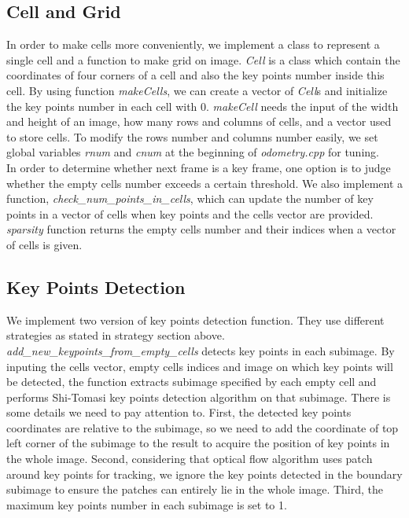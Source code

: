 \documentclass{easychair}
\begin{document}
\subsection{Cell and Grid}
In order to make cells more conveniently, we implement a class to represent a single cell and a function to make grid on image. \emph{Cell} is a class which contain the coordinates of four corners of a cell and also the key points number inside this cell. By using function \emph{makeCells}, we can create a vector of \emph{Cell}s and initialize the key points number in each cell with 0. \emph{makeCell} needs the input of the width and height of an image, how many rows and columns of cells, and a vector used to store cells. To modify the rows number and columns number easily, we set global variables \emph{rnum} and \emph{cnum} at the beginning of \emph{odometry.cpp} for tuning.\\

In order to determine whether next frame is a key frame, one option is to judge whether the empty cells number exceeds a certain threshold. We also implement a function, \emph{check\_num\_points\_in\_cells}, which can update the number of key points in a vector of cells when key points and the cells vector are provided.  \emph{sparsity} function returns the empty cells number and their indices when a vector of cells is given. \\

\subsection{Key Points Detection}
We implement two version of key points detection function. They use different strategies as stated in strategy section above. \\

\emph{add\_new\_keypoints\_from\_empty\_cells} detects key points in each subimage. By inputing the cells vector, empty cells indices and image on which key points will be detected, the function extracts subimage specified by each empty cell and performs Shi-Tomasi key points detection algorithm on that subimage. There is some details we need to pay attention to. First, the detected key points coordinates are relative to the subimage, so we need to add the coordinate of top left corner of the subimage to the result to acquire the position of key points in the whole image. Second, considering that optical flow algorithm uses patch around key points for tracking, we ignore the key points detected in the boundary subimage to ensure the patches can entirely lie in the whole image. Third, the maximum key points number in each subimage is set to 1.\\
\end{document}
